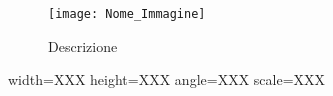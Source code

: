 \begin{figure}
  \centering  %
  \texttt{[image: Nome\_Immagine]}
  \caption{Descrizione}
  \label{Image_Tag}
\end{figure}

width=XXX
height=XXX
angle=XXX
scale=XXX

